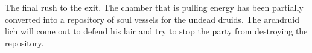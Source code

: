 The final rush to the exit.
The chamber that is pulling energy has been partially converted into a repository of soul vessels for the undead druids.
The archdruid lich will come out to defend his lair and try to stop the party from destroying the repository.